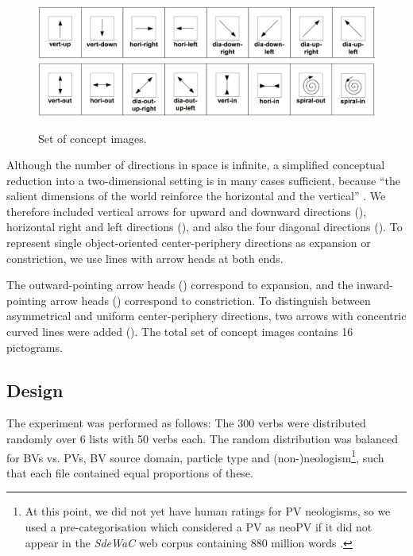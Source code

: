 \documentclass[output=paper]{langsci/langscibook}
\begin{document}
\begin{figure}
  \caption{Set of concept images.}
  \label{fig:CIdir}
  \includegraphics[width=.95\linewidth]{figures/CIs-1-8.png}\\
  \includegraphics[width=.95\linewidth]{figures/CIs-9-16}
\end{figure}

Although the number of directions in space is infinite, a simplified
conceptual reduction into a two-dimensional setting is in many cases
sufficient, because ``the salient dimensions of the world reinforce
the horizontal and the vertical'' \citep{Tversky:11}. We therefore
included vertical arrows for upward and downward directions
(), horizontal right and left directions
(), and also the four diagonal
directions (). To represent single object-oriented center-periphery
directions as expansion or constriction, we use lines with arrow heads at
both ends.

The outward-pointing arrow heads
()
correspond to expansion, and the inward-pointing arrow heads
() correspond to constriction. To distinguish
between asymmetrical and uniform center-periphery directions, two
arrows with concentric curved lines were added (). The total set of concept images contains 16 pictograms.


\subsection{Design}
\label{sec:design}

The experiment was performed as follows: The 300 verbs were
distributed randomly over 6 lists with 50 verbs each. The random
distribution was balanced for BVs vs. PVs, BV source domain, particle
type and (non-)neologism\footnote{At this point, we did not yet have
  human ratings for PV neologisms, so we used a pre-categorisation
  which considered a PV as neoPV if it did not appear in the
  \textit{SdeWaC} web corpus containing 880 million words
  \citep{Faass/Eckart:13}.}, such that each file contained equal
proportions of these.
\end{document}
